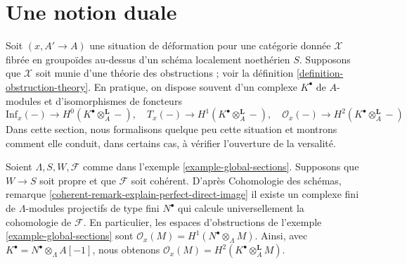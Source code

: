  
 
 
 
 
 
 
 
\section{Une notion duale}
\label{section-dual}

\noindent
Soit $(x, A' \to A)$ une situation de déformation pour une catégorie donnée
$\mathcal{X}$ fibrée en groupoïdes au-dessus d'un schéma localement noethérien $S$.
Supposons que $\mathcal{X}$ soit munie d'une théorie des obstructions ; voir la
définition \ref{definition-obstruction-theory}. En pratique,
on dispose souvent d'un complexe $K^\bullet$ de $A$-modules et d'isomorphismes de
foncteurs
$$
\text{Inf}_x(-) \to H^0(K^\bullet \otimes_A^\mathbf{L} -),\quad
T_x(-) \to H^1(K^\bullet \otimes_A^\mathbf{L} -),\quad
\mathcal{O}_x(-) \to H^2(K^\bullet \otimes_A^\mathbf{L} -)
$$
Dans cette section, nous formalisons quelque peu cette situation et montrons comment elle conduit,
dans certains cas, à vérifier l'ouverture de la versalité.

\begin{example}
\label{example-global-sections-dual}
Soient $\Lambda, S, W, \mathcal{F}$ comme dans
l'exemple \ref{example-global-sections}.
Supposons que $W \to S$ soit propre et que $\mathcal{F}$ soit cohérent. D'après
Cohomologie des schémas, remarque
\ref{coherent-remark-explain-perfect-direct-image}
il existe un complexe fini de $\Lambda$-modules projectifs de type fini
$N^\bullet$ qui calcule universellement la cohomologie de $\mathcal{F}$.
En particulier, les espaces d'obstructions de l'exemple \ref{example-global-sections}
sont $\mathcal{O}_x(M) = H^1(N^\bullet \otimes_\Lambda M)$.
Ainsi, avec $K^\bullet = N^\bullet \otimes_\Lambda A[-1]$, nous obtenons
$\mathcal{O}_x(M) = H^2(K^\bullet \otimes_A^\mathbf{L} M)$.
\end{example}

